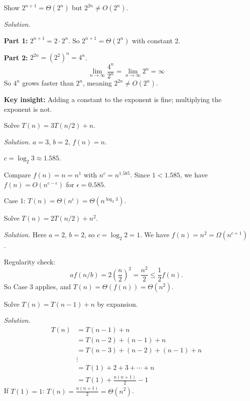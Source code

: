 \begin{example}
Show $2^{n+1} = \Theta(2^n)$ but $2^{2n} \neq O(2^n)$.

\emph{Solution.}

\textbf{Part 1:} $2^{n+1} = 2 \cdot 2^n$. So $2^{n+1} = \Theta(2^n)$ with constant 2.

\textbf{Part 2:} $2^{2n} = (2^2)^n = 4^n$.
\[
\lim_{n \to \infty} \frac{4^n}{2^n} = \lim_{n \to \infty} 2^n = \infty
\]
So $4^n$ grows faster than $2^n$, meaning $2^{2n} \neq O(2^n)$.

\textbf{Key insight:} Adding a constant to the exponent is fine; multiplying the exponent is not.
\end{example}

\begin{example}
Solve $T(n) = 3T(n/2) + n$.

\emph{Solution.} $a = 3$, $b = 2$, $f(n) = n$.

$c = \log_2 3 \approx 1.585$.

Compare $f(n) = n = n^1$ with $n^c = n^{1.585}$. Since $1 < 1.585$, we have $f(n) = O(n^{c - \epsilon})$ for $\epsilon = 0.585$.

Case 1: $T(n) = \Theta(n^c) = \Theta(n^{\log_2 3})$.
\end{example}

\begin{example}
Solve $T(n) = 2T(n/2) + n^2$.

\emph{Solution.} Here $a = 2$, $b = 2$, so $c = \log_2 2 = 1$. We have $f(n) = n^2 = \Omega(n^{c+1})$.

Regularity check:
\[
a f(n/b) = 2 \left(\frac{n}{2}\right)^2 = \frac{n^2}{2} \leq \frac{1}{2} f(n).
\]
So Case 3 applies, and $T(n) = \Theta(f(n)) = \Theta(n^2)$.
\end{example}

\begin{example}
Solve $T(n) = T(n-1) + n$ by expansion.

\emph{Solution.}
\begin{align*}
T(n) &= T(n-1) + n \\
     &= T(n-2) + (n-1) + n \\
     &= T(n-3) + (n-2) + (n-1) + n \\
     &\vdots \\
     &= T(1) + 2 + 3 + \cdots + n \\
     &= T(1) + \frac{n(n+1)}{2} - 1
\end{align*}
If $T(1) = 1$: $T(n) = \frac{n(n+1)}{2} = \Theta(n^2)$.
\end{example}

